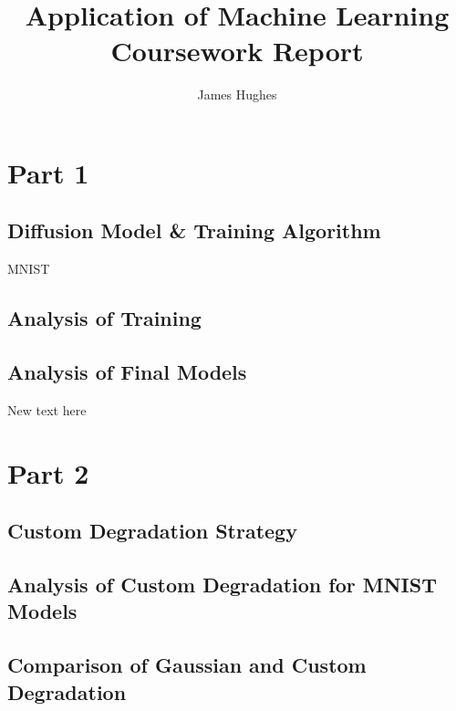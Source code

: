 \documentclass[12pt]{article}
\title{Application of Machine Learning Coursework Report}
\author{James Hughes}
\begin{document}
\maketitle
\newpage

\section*{Part 1}
\subsection*{Diffusion Model \& Training Algorithm}
MNIST \cite{mnist}
\subsection*{Analysis of Training}
\subsection*{Analysis of Final Models}
New text here

\section*{Part 2}
\subsection*{Custom Degradation Strategy}
\subsection*{Analysis of Custom Degradation for MNIST Models}
\subsection*{Comparison of Gaussian and Custom Degradation}


\end{document}
